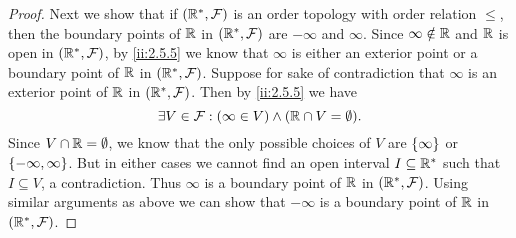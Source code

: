 \begin{proof}
  Next we show that if \((\mathbb{R}^*, \mathcal{F})\) is an order topology with order relation \(\leq\), then the boundary points of \(\mathbb{R}\) in \((\mathbb{R}^*, \mathcal{F})\) are \(-\infty\) and \(\infty\).
  Since \(\infty \notin \mathbb{R}\) and \(\mathbb{R}\) is open in \((\mathbb{R}^*, \mathcal{F})\), by \cref{ii:2.5.5} we know that \(\infty\) is either an exterior point or a boundary point of \(\mathbb{R}\) in \((\mathbb{R}^*, \mathcal{F})\).
  Suppose for sake of contradiction that \(\infty\) is an exterior point of \(\mathbb{R}\) in \((\mathbb{R}^*, \mathcal{F})\).
  Then by \cref{ii:2.5.5} we have
  \[
    \exists V \in \mathcal{F} : (\infty \in V) \land (\mathbb{R} \cap V = \emptyset).
  \]
  Since \(V \cap \mathbb{R} = \emptyset\), we know that the only possible choices of \(V\) are \(\left\lbrace\infty\right\rbrace\) or \(\left\lbrace-\infty, \infty\right\rbrace\).
  But in either cases we cannot find an open interval \(I \subseteq \mathbb{R}^*\) such that \(I \subseteq V\), a contradiction.
  Thus \(\infty\) is a boundary point of \(\mathbb{R}\) in \((\mathbb{R}^*, \mathcal{F})\).
  Using similar arguments as above we can show that \(-\infty\) is a boundary point of \(\mathbb{R}\) in \((\mathbb{R}^*, \mathcal{F})\).


\end{proof}
